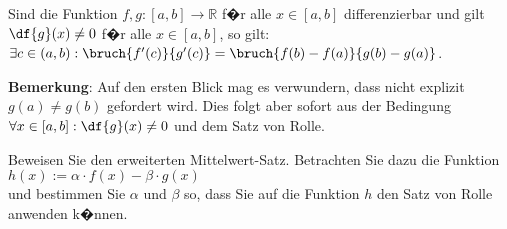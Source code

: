 \pagebreak

\begin{Satz}
  Sind die Funktion $f,g:[a,b] \rightarrow \mathbb{R}$ f�r alle $x\in[a,b]$
  differenzierbar und gilt $\df{g}(x) \not= 0$ f�r alle $x \in [a,b]$,
  so gilt: 
  \\[0.3cm]
  \hspace*{1.3cm}
  $\exists c \in (a,b): \bruch{f'(c)}{g'(c)} = \bruch{f(b) - f(a)}{g(b) - g(a)}$.
  \eox
\end{Satz}

\noindent
\textbf{Bemerkung}: Auf den ersten Blick mag es verwundern, dass nicht explizit 
$g(a) \not = g(b)$ gefordert wird.  Dies folgt aber sofort aus der Bedingung
$\forall x \in [a,b]:\df{g}(x) \not= 0$ und dem Satz von Rolle. \eox
\vspace*{0.3cm}

\exercise
Beweisen Sie den erweiterten Mittelwert-Satz.  Betrachten Sie dazu die Funktion
\\[0.2cm]
\hspace*{1.3cm}
$h(x) := \alpha \cdot f(x) - \beta \cdot g(x)$
\\[0.2cm]
und bestimmen Sie $\alpha$ und $\beta$ so, dass Sie auf die Funktion $h$ den Satz von Rolle anwenden k�nnen. \eox

